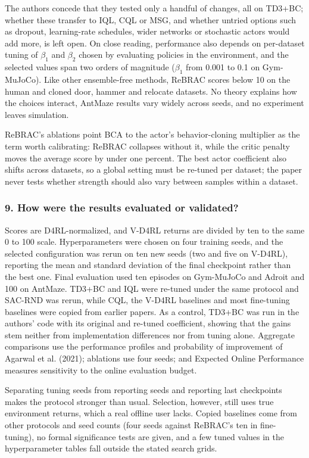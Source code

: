 \documentclass[11pt]{article}
\newcommand{\question}[1]{\subsubsection*{#1}}
\begin{document}
The authors concede that they tested only a handful of changes, all on TD3+BC; whether these transfer to IQL, CQL or MSG, and whether untried options such as dropout, learning-rate schedules, wider networks or stochastic actors would add more, is left open. On close reading, performance also depends on per-dataset tuning of $\beta_{1}$ and $\beta_{2}$ chosen by evaluating policies in the environment, and the selected values span two orders of magnitude ($\beta_{1}$ from 0.001 to 0.1 on Gym-MuJoCo). Like other ensemble-free methods, ReBRAC scores below 10 on the human and cloned door, hammer and relocate datasets. No theory explains how the choices interact, AntMaze results vary widely across seeds, and no experiment leaves simulation.

ReBRAC's ablations point BCA to the actor's behavior-cloning multiplier as the term worth calibrating: ReBRAC collapses without it, while the critic penalty moves the average score by under one percent. The best actor coefficient also shifts across datasets, so a global setting must be re-tuned per dataset; the paper never tests whether strength should also vary between samples within a dataset.

\question{9. How were the results evaluated or validated?}

Scores are D4RL-normalized, and V-D4RL returns are divided by ten to the same 0 to 100 scale. Hyperparameters were chosen on four training seeds, and the selected configuration was rerun on ten new seeds (two and five on V-D4RL), reporting the mean and standard deviation of the final checkpoint rather than the best one. Final evaluation used ten episodes on Gym-MuJoCo and Adroit and 100 on AntMaze. TD3+BC and IQL were re-tuned under the same protocol and SAC-RND was rerun, while CQL, the V-D4RL baselines and most fine-tuning baselines were copied from earlier papers. As a control, TD3+BC was run in the authors' code with its original and re-tuned coefficient, showing that the gains stem neither from implementation differences nor from tuning alone. Aggregate comparisons use the performance profiles and probability of improvement of Agarwal et al. (2021); ablations use four seeds; and Expected Online Performance measures sensitivity to the online evaluation budget.

Separating tuning seeds from reporting seeds and reporting last checkpoints makes the protocol stronger than usual. Selection, however, still uses true environment returns, which a real offline user lacks. Copied baselines come from other protocols and seed counts (four seeds against ReBRAC's ten in fine-tuning), no formal significance tests are given, and a few tuned values in the hyperparameter tables fall outside the stated search grids.
\end{document}
